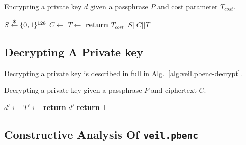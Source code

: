\begin{algorithm}[ht]
    \caption{
        Encrypting a private key $d$ given a passphrase $P$ and cost parameter $T_{cost}$.
    }
    \begin{algorithmic}
            \State $S \stackrel{\$}{\gets} \{0,1\}^{128}$
            \State {}
            \State $C \gets$
            \State $T \gets$
            \State \textbf{return} $T_{cost} || S || C || T$
        \EndFunction
    \end{algorithmic}
    \label{alg:veil.pbenc-encrypt}
\end{algorithm}

\subsection{Decrypting A Private key}\label{subsec:veil.pbenc-decrypt}

Decrypting a private key is described in full in Alg.~\ref{alg:veil.pbenc-decrypt}\@.

\begin{algorithm}[ht]
    \caption{
        Decrypting a private key given a passphrase $P$ and ciphertext $C$.
    }
    \begin{algorithmic}
            \State {}
            \State $d' \gets$
            \State $T' \gets$
            \State \textbf{return} $d'$
            \Else
                \State \textbf{return} $\bot$
            \EndIf
        \EndFunction
    \end{algorithmic}
    \label{alg:veil.pbenc-decrypt}
\end{algorithm}

\subsection{Constructive Analysis Of \texttt{veil.pbenc}}\label{subsec:veil.pbenc-analysis}

